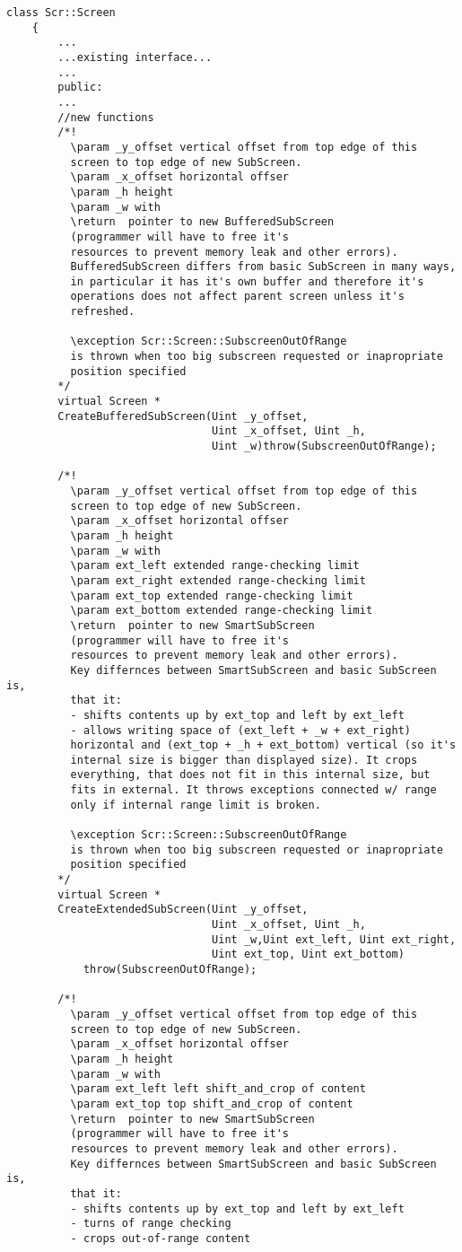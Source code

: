 \documentclass[11pt,a4paper]{article}
\begin{document}
\begin{lstlisting}
class Scr::Screen
    {
		...
		...existing interface...
		...
		public:
		...
		//new functions
		/*!
		  \param _y_offset vertical offset from top edge of this
		  screen to top edge of new SubScreen.
		  \param _x_offset horizontal offser
		  \param _h height
		  \param _w with
		  \return  pointer to new BufferedSubScreen
		  (programmer will have to free it's
		  resources to prevent memory leak and other errors).
		  BufferedSubScreen differs from basic SubScreen in many ways,
		  in particular it has it's own buffer and therefore it's
		  operations does not affect parent screen unless it's
		  refreshed. 
	  
		  \exception Scr::Screen::SubscreenOutOfRange
		  is thrown when too big subscreen requested or inapropriate
		  position specified
		*/
		virtual Screen *
		CreateBufferedSubScreen(Uint _y_offset,
								Uint _x_offset, Uint _h,
								Uint _w)throw(SubscreenOutOfRange);
	
		/*!
		  \param _y_offset vertical offset from top edge of this
		  screen to top edge of new SubScreen.
		  \param _x_offset horizontal offser
		  \param _h height
		  \param _w with
		  \param ext_left extended range-checking limit
		  \param ext_right extended range-checking limit
		  \param ext_top extended range-checking limit
		  \param ext_bottom extended range-checking limit
		  \return  pointer to new SmartSubScreen
		  (programmer will have to free it's
		  resources to prevent memory leak and other errors).
		  Key differnces between SmartSubScreen and basic SubScreen is,
		  that it:
		  - shifts contents up by ext_top and left by ext_left
		  - allows writing space of (ext_left + _w + ext_right)
		  horizontal and (ext_top + _h + ext_bottom) vertical (so it's
		  internal size is bigger than displayed size). It crops
		  everything, that does not fit in this internal size, but
		  fits in external. It throws exceptions connected w/ range
		  only if internal range limit is broken.	  
	  
		  \exception Scr::Screen::SubscreenOutOfRange
		  is thrown when too big subscreen requested or inapropriate
		  position specified	  
		*/
		virtual Screen *
		CreateExtendedSubScreen(Uint _y_offset,
								Uint _x_offset, Uint _h,
								Uint _w,Uint ext_left, Uint ext_right, 
								Uint ext_top, Uint ext_bottom)
			throw(SubscreenOutOfRange);
	
		/*!
		  \param _y_offset vertical offset from top edge of this
		  screen to top edge of new SubScreen.
		  \param _x_offset horizontal offser
		  \param _h height
		  \param _w with
		  \param ext_left left shift_and_crop of content
		  \param ext_top top shift_and_crop of content
		  \return  pointer to new SmartSubScreen
		  (programmer will have to free it's
		  resources to prevent memory leak and other errors).
		  Key differnces between SmartSubScreen and basic SubScreen is,
		  that it:
		  - shifts contents up by ext_top and left by ext_left
		  - turns of range checking
		  - crops out-of-range content
	  

\end{lstlisting}
\end{document}
